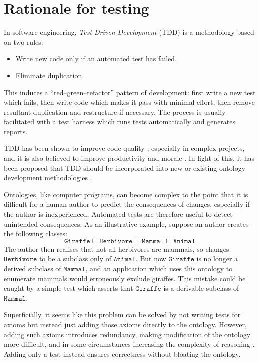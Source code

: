 \documentclass[paper.tex]{subfiles}
\begin{document}
\section{Rationale for testing}
\label{sec:rationale}

In software engineering, \emph{Test-Driven Development} (TDD) \cite{Beck:TDD} is a methodology based on two rules:
\begin{itemize}[nosep]
  \item Write new code only if an automated test has failed.
  \item Eliminate duplication.
\end{itemize}
This induces a ``red--green--refactor'' pattern of development: first write a new test which fails, then write code which makes it pass with minimal effort, then remove resultant duplication and restructure if necessary.
The process is usually facilitated with a test harness which runs tests automatically and generates reports.

TDD has been shown to improve code quality \cite{Rafique:TDD}, especially in complex projects, and it is also believed to improve productivity and morale \cite{Beck:TDD}.
In light of this, it has been proposed that TDD should be incorporated into new or existing ontology development methodologies \cite{Keet:TDDOntologies}.

Ontologies, like computer programs, can become complex to the point that it is difficult for a human author to predict the consequences of changes, especially if the author is inexperienced.
Automated tests are therefore useful to detect unintended consequences.
As an illustrative example, suppose an author creates the following classes:
\[ \mathtt{Giraffe} \sqsubseteq \mathtt{Herbivore} \sqsubseteq \mathtt{Mammal} \sqsubseteq \mathtt{Animal} \]
The author then realises that not all herbivores are mammals, so changes $\mathtt{Herbivore}$ to be a subclass only of $\mathtt{Animal}$.
But now $\mathtt{Giraffe}$ is no longer a derived subclass of $\mathtt{Mammal}$, and an application which uses this ontology to enumerate mammals would erroneously exclude giraffes.
This mistake could be caught by a simple test which asserts that $\mathtt{Giraffe}$ is a derivable subclass of $\mathtt{Mammal}$.

Superficially, it seems like this problem can be solved by not writing tests for axioms but instead just adding those axioms directly to the ontology.
However, adding such axioms introduces redundancy, making modification of the ontology more difficult, and in some circumstances increasing the complexity of reasoning \cite{Vrandecic:UnitTestsOntologies}.
Adding only a test instead ensures correctness without bloating the ontology.
\end{document}

